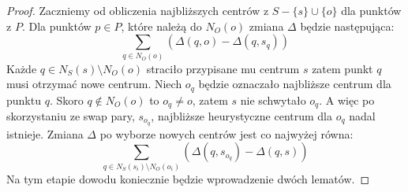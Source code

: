 \begin{proof}
    Zaczniemy od obliczenia najbliższych centrów z $S - \{s\} \cup \{o\}$ dla punktów z $P$.
    Dla punktów $p \in P$, które należą do $N_{O}(o)$ zmiana $\Delta$ będzie następująca:
    \begin{equation}
        \sum_{q \in N_{O}(o)} (\Delta(q, o) - \Delta(q, s_{q}))
    \end{equation}
    Każde $q \in N_{S}(s) \setminus N_{O}(o)$ straciło przypisane mu centrum $s$ zatem punkt $q$ musi otrzymać nowe centrum.
    Niech $o_{q}$ będzie oznaczało najbliższe centrum dla punktu $q$.
    Skoro $q \notin N_{O}(o)$ to $o_{q} \neq o$, zatem $s$ nie schwytało $o_{q}$.
    A więc po skorzystaniu ze swap pary, $s_{o_{q}}$, najbliższe heurystyczne centrum dla $o_{q}$ nadal istnieje.
    Zmiana $\Delta$ po wyborze nowych centrów jest co najwyżej równa:
    \begin{equation}
        \sum_{q \in N_{S}(s_{i}) \setminus N_{O}(o_{i})} (\Delta(q, s_{o_{q}}) - \Delta(q, s))
    \end{equation}
    Na tym etapie dowodu koniecznie będzie wprowadzenie dwóch lematów.
    

\end{proof}
